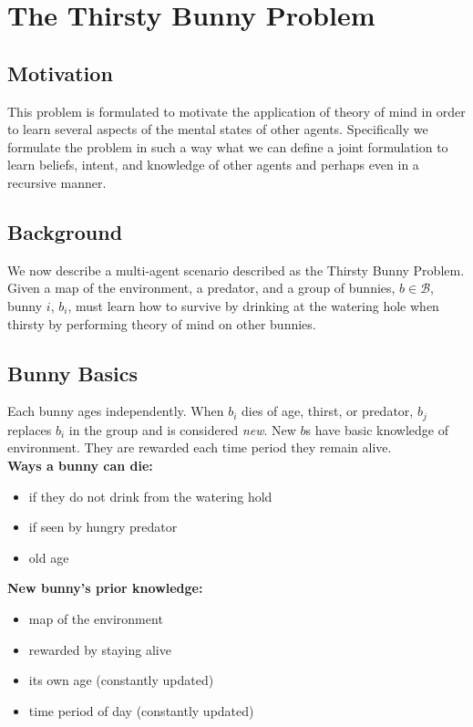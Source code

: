 \documentclass[twocolumn]{article}
\begin{document}
\section{The Thirsty Bunny Problem}

\subsection{Motivation}
This problem is formulated to motivate the application of theory of mind in order to learn several aspects of the mental states of other agents. Specifically we formulate the problem in such a way what we can define a joint formulation to learn beliefs, intent, and knowledge of other agents and perhaps even in a recursive manner. 

\subsection{Background}
We now describe a multi-agent scenario described as the Thirsty Bunny Problem. Given a map of the environment, a predator, and a group of bunnies, $b \in \mathcal{B}$, bunny $i$, $b_i$, must learn how to survive by drinking at the watering hole when thirsty by performing theory of mind on other bunnies. 

\subsection{Bunny Basics}
Each bunny ages independently. When $b_i$ dies of age, thirst, or predator, $b_j$ replaces $b_i$ in the group and is considered \textit{new}. New $b$s have basic knowledge of environment. They are rewarded each time period they remain alive. \\

\noindent\textbf{Ways a bunny can die:}
\begin{itemize}
	\item if they do not drink from the watering hold
    \item if seen by hungry predator
    \item old age 
\end{itemize}

\noindent\textbf{New bunny's prior knowledge:}
\begin{itemize}
    \item map of the environment
    \item rewarded by staying alive
    \item its own age (constantly updated)
    \item time period of day (constantly updated)
\end{itemize}
\end{document}
